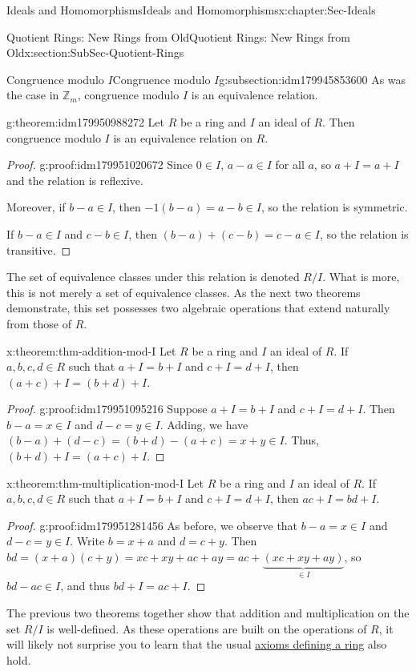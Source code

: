 \documentclass[oneside,10pt,]{book}
\numberwithin{equation}{section}
\def\Z{{\mathbb Z}}
\begin{document}
\begin{chapterptx}{Ideals and Homomorphisms}{}{Ideals and Homomorphisms}{}{}{x:chapter:Sec-Ideals}
\begin{sectionptx}{Quotient Rings: New Rings from Old}{}{Quotient Rings: New Rings from Old}{}{}{x:section:SubSec-Quotient-Rings}
\begin{subsectionptx}{Congruence modulo \(I\)}{}{Congruence modulo \(I\)}{}{}{g:subsection:idm179945853600}
As was the case in \(\Z_m\), congruence modulo \(I\) is an equivalence relation.%
\begin{theorem}{}{}{g:theorem:idm179950988272}%
Let \(R\) be a ring and \(I\) an ideal of \(R\). Then congruence modulo \(I\) is an equivalence relation on \(R\).%
\end{theorem}
\begin{proof}{}{g:proof:idm179951020672}
Since \(0\in I\), \(a-a \in I\) for all \(a\), so \(a + I = a+I\) and the relation is reflexive.%
\par
Moreover, if \(b-a \in I\), then \(-1(b-a) = a-b \in I\), so the relation is symmetric.%
\par
If \(b-a \in I\) and \(c-b\in I\), then \((b-a) + (c-b) = c-a \in I\), so the relation is transitive.%
\end{proof}
The set of equivalence classes under this relation is denoted \(R/I\). What is more, this is not merely a set of equivalence classes. As the next two theorems demonstrate, this set possesses two algebraic operations that extend naturally from those of \(R\).%
\begin{theorem}{}{}{x:theorem:thm-addition-mod-I}%
Let \(R\) be a ring and \(I\) an ideal of \(R\). If \(a,b,c,d\in R\) such that \(a+I = b+I\) and \(c+I = d+I\), then \((a+c) + I = (b+d) + I\).%
\end{theorem}
\begin{proof}{}{g:proof:idm179951095216}
Suppose \(a+I = b+I\) and \(c+I = d+I\). Then \(b-a =x \in I\) and \(d-c = y \in I\). Adding, we have \((b-a) + (d-c) = (b+d) - (a+c) = x+y \in I\). Thus, \((b+d) + I = (a+c) + I\).%
\end{proof}
\begin{theorem}{}{}{x:theorem:thm-multiplication-mod-I}%
Let \(R\) be a ring and \(I\) an ideal of \(R\). If \(a,b,c,d\in R\) such that \(a+I = b+I\) and \(c+I = d+I\), then \(ac + I = bd + I\).%
\end{theorem}
\begin{proof}{}{g:proof:idm179951281456}
As before, we observe that \(b-a = x\in I\) and \(d-c = y\in I\). Write \(b = x+a\) and \(d = c+y\). Then \(bd = (x+a)(c+y) = xc + xy + ac + ay = ac + \underbrace{(xc+xy+ay)}_{\in I}\), so \(bd - ac \in I\), and thus \(bd + I = ac + I\).%
\end{proof}
The previous two theorems together show that addition and multiplication on the set \(R/I\) is well-defined. As these operations are built on the operations of \(R\), it will likely not surprise you to learn that the usual \hyperref[x:definition:def_ring]{axioms defining a ring} also hold.%

\end{subsectionptx}
\end{sectionptx}
\end{chapterptx}
\end{document}
